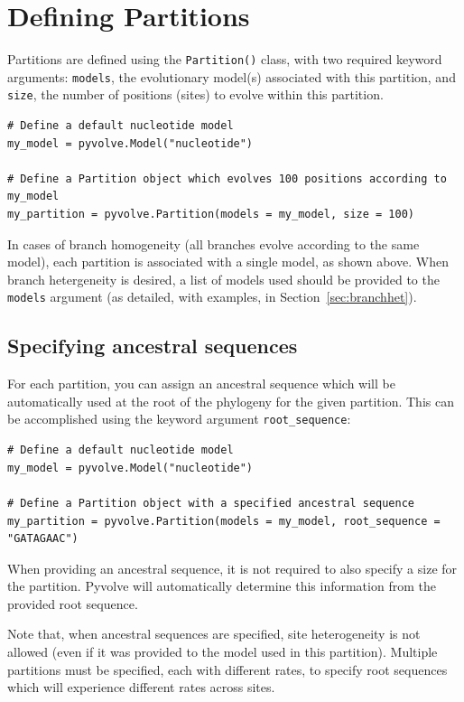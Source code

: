 \documentclass{article}
\newcommand{\code}[1]{\texttt{\small{#1}}}
\begin{document}
\section{Defining Partitions}\label{sec:partitions}

Partitions are defined using the \code{Partition()} class, with two required keyword arguments: \code{models}, the evolutionary model(s) associated with this partition, and \code{size}, the number of positions (sites) to evolve within this partition.
\begin{lstlisting}
# Define a default nucleotide model
my_model = pyvolve.Model("nucleotide")

# Define a Partition object which evolves 100 positions according to my_model
my_partition = pyvolve.Partition(models = my_model, size = 100)
\end{lstlisting}

In cases of branch homogeneity (all branches evolve according to the same model), each partition is associated with a single model, as shown above. When branch hetergeneity is desired, a list of models used should be provided to the \code{models} argument (as detailed, with examples, in Section~\ref{sec:branchhet}).

\subsection{Specifying ancestral sequences}

For each partition, you can assign an ancestral sequence which will be automatically used at the root of the phylogeny for the given partition. This can be accomplished using the keyword argument \code{root\_sequence}:

\begin{lstlisting}
# Define a default nucleotide model
my_model = pyvolve.Model("nucleotide")

# Define a Partition object with a specified ancestral sequence
my_partition = pyvolve.Partition(models = my_model, root_sequence = "GATAGAAC")
\end{lstlisting}

When providing an ancestral sequence, it is not required to also specify a size for the partition. Pyvolve will automatically determine this information from the provided root sequence. 

Note that, when ancestral sequences are specified, site heterogeneity is not allowed (even if it was provided to the model used in this partition). Multiple partitions must be specified, each with different rates, to specify root sequences which will experience different rates across sites.
\end{document}
